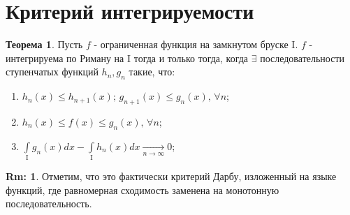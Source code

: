 \documentclass[12pt]{article}
\newcommand{\MI}{\mathrm{I}}
\theoremstyle{definition}
\newtheorem{rem}{Rm:}
\newtheorem{theorem}{Теорема}
\newcommand{\ddint}[2]{\displaystyle\int\limits_{#1}^{#2}}
\begin{document}
\section*{Критерий интегрируемости}
\begin{theorem}
	Пусть $f$ - ограниченная функция на замкнутом бруске $\MI$. $f$ - интегрируема по Риману на $\MI$ тогда и только тогда, когда $\exists$ последовательности ступенчатых функций $h_n, g_n$ такие, что:
	\begin{enumerate}[label=\arabic*)]
		\item $h_n(x) \leq h_{n+1}(x); \,  g_{n+1}(x) \leq g_n(x),\, \forall n$;
		\item $h_n(x) \leq f(x) \leq g_n(x),\, \forall n$;
		\item $\ddint{\MI}{}g_n(x)dx - \ddint{\MI}{}h_n(x)dx \xrightarrow[n \to \infty]{} 0$;
	\end{enumerate}
\end{theorem}
\begin{rem}
	Отметим, что это фактически критерий Дарбу, изложенный на языке функций, где равномерная сходимость заменена на монотонную последовательность.
\end{rem}
\end{document}
